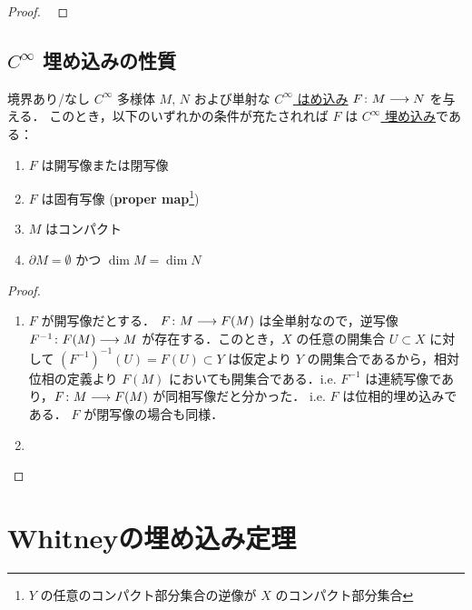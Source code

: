 \documentclass[geometry_main]{subfiles}
\begin{document}
\begin{proof}
    ~\cite[p.84, Theorem 4.15]{Lee12}
\end{proof}

\subsection{$C^\infty$ 埋め込みの性質}

\begin{myprop}[label=prop:embedding-basic]{}
    境界あり/なし $C^\infty$ 多様体 $M,\, N$ および単射な \hyperref[def:submersion-smooth-appendix]{$C^\infty$ はめ込み} $F \colon M \longrightarrow N$ を与える．
    このとき，以下のいずれかの条件が充たされれば $F$ は \hyperref[def:submersion-smooth-appendix]{$C^\infty$ 埋め込み}である：
    \begin{enumerate}
        \item $F$ は開写像または閉写像
        \item $F$ は固有写像 (\textbf{proper map}\footnote{$Y$ の任意のコンパクト部分集合の逆像が $X$ のコンパクト部分集合})
        \item $M$ はコンパクト
        \item $\partial M = \emptyset$ かつ $\dim M = \dim N$
    \end{enumerate}
    
\end{myprop}

\begin{proof}
    \begin{enumerate}
        \item $F$ が開写像だとする．
        $F \colon M \longrightarrow F(M)$ は全単射なので，逆写像 $F^{-1} \colon F(M) \longrightarrow M$ が存在する．このとき，$X$ の任意の開集合 $U \subset X$ に対して $(F^{-1})^{-1}(U) = F(U) \subset Y$ は仮定より $Y$ の開集合であるから，相対位相の定義より $F(M)$ においても開集合である．i.e. $F^{-1}$ は連続写像であり，$F \colon M \longrightarrow F(M)$ が同相写像だと分かった．
        i.e. $F$ は位相的埋め込みである．
        $F$ が閉写像の場合も同様．
        \item 
    \end{enumerate}
    
\end{proof}

\section{Whitneyの埋め込み定理}

	
\end{document}
